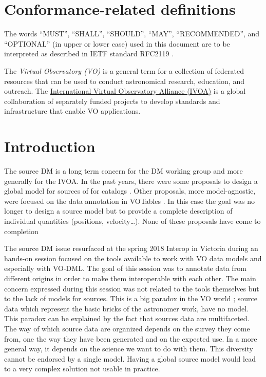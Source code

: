 \documentclass[11pt,a4paper]{ivoa}
\begin{document}
\section*{Conformance-related definitions}

The words ``MUST'', ``SHALL'', ``SHOULD'', ``MAY'', ``RECOMMENDED'', and
``OPTIONAL'' (in upper or lower case) used in this document are to be
interpreted as described in IETF standard RFC2119 \citep{std:RFC2119}.

The \emph{Virtual Observatory (VO)} is a
general term for a collection of federated resources that can be used
to conduct astronomical research, education, and outreach.
The \href{http://www.ivoa.net}{International
Virtual Observatory Alliance (IVOA)} is a global
collaboration of separately funded projects to develop standards and
infrastructure that enable VO applications.


\section{Introduction}

The source DM is a long term concern for the DM working group and more generally for the IVOA.
In the past years, there were some proposals to design a global model for sources \citep{wd:jesusdm} of for catalogs \citep{wd:catalog}.
Other proposals, more model-agnostic, were focused on the data annotation in VOTables \citep{note:stcvot} \citep{note:seb}. In this case the goal was no longer to design a source model but to provide a complete description of  individual quantities (positions, velocity…).
None of these proposals have come to completion

The source DM issue resurfaced at the spring 2018 Interop in Victoria during an hands-on session focused on the tools available to work with VO data models and especially with VO-DML. The goal of this session was to annotate data from different origins in order to make them interoperable with each other. The main concern expressed during this session was not related to the tools themselves but to the lack of models for sources. 
This is a big paradox in the VO world ; source data which represent the basic bricks of the astronomer work, have no model. This paradox can be explained by the fact that sources data are multifaceted. The way of which source data are organized depends on the survey they come from, one the way they have been generated  and on the expected use. In a more general way, it depends on the science we want to do with them. This diversity cannot be endorsed by a single model. Having a global source model would lead to a very complex solution not usable in practice.
\end{document}
